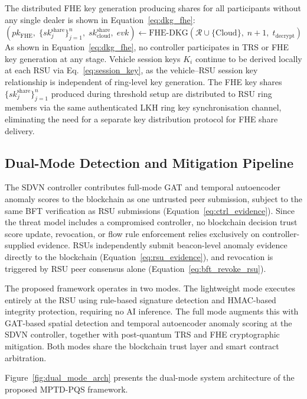 \documentclass[12pt, a4paper]{report}
\begin{document}
The distributed FHE key generation producing shares for all
participants without any single dealer is shown in
Equation~\ref{eq:dkg_fhe}:
\begin{equation}
  (pk_{\mathrm{FHE}},\; \{sk_j^{\mathrm{share}}\}_{j=1}^{n},\;
   sk_{\mathrm{cloud}}^{\mathrm{share}},\; evk)
  \leftarrow \mathrm{FHE\text{-}DKG}
  (\mathcal{R} \cup \{\mathrm{Cloud}\},\; n+1,\;
   t_{\mathrm{decrypt}})
  \label{eq:dkg_fhe}
\end{equation}
As shown in Equation~\ref{eq:dkg_fhe}, no controller participates
in TRS or FHE key generation at any stage. Vehicle session keys
$K_i$ continue to be derived locally at each RSU via
Eq.~\eqref{eq:session_key}, as the vehicle--RSU session key
relationship is independent of ring-level key generation. The FHE
key shares $\{sk_j^{\mathrm{share}}\}_{j=1}^{n}$ produced during
threshold setup are distributed to RSU ring members via the same
authenticated LKH ring key synchronisation channel, eliminating
the need for a separate key distribution protocol for FHE share
delivery.


\subsection{Dual-Mode Detection and Mitigation Pipeline}
\label{sec:dual_mode}

The SDVN controller contributes full-mode GAT and temporal autoencoder
anomaly scores to the blockchain as one untrusted peer submission, subject
to the same BFT verification as RSU submissions
(Equation~\ref{eq:ctrl_evidence}). Since the threat model includes a
compromised controller, no blockchain decision trust score update,
revocation, or flow rule enforcement relies exclusively on
controller-supplied evidence. RSUs independently submit beacon-level
anomaly evidence directly to the blockchain
(Equation~\ref{eq:rsu_evidence}), and revocation is triggered by RSU
peer consensus alone (Equation~\ref{eq:bft_revoke_rsu}).

The proposed framework operates in two modes. The lightweight mode
executes entirely at the RSU using rule-based signature detection and
HMAC-based integrity protection, requiring no AI inference. The full
mode augments this with GAT-based spatial detection and temporal autoencoder
anomaly scoring at the SDVN controller, together with post-quantum TRS and FHE
cryptographic mitigation. Both modes share the blockchain trust layer and
smart contract arbitration.

Figure~\ref{fig:dual_mode_arch} presents the dual-mode system
architecture of the proposed MPTD-PQS framework.
\end{document}
